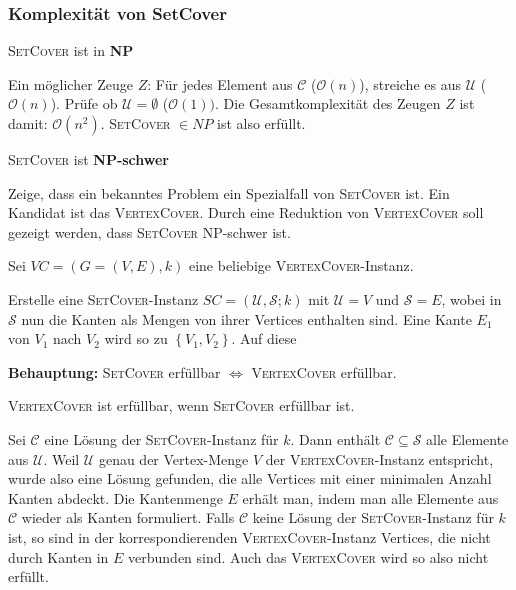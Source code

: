 \documentclass{article}
\begin{document}
\subsubsection*{Komplexität von SetCover}
\textsc{SetCover} ist in \textbf{NP}

Ein möglicher Zeuge $Z$: Für jedes Element aus $\mathcal{C}$ ($\mathcal{O}(n)$), streiche es aus $\mathcal{U}$ ($\mathcal{O}(n)$). Prüfe ob $\mathcal{U} = \emptyset$ ($\mathcal{O}(1))$. Die Gesamtkomplexität des Zeugen $Z$ ist damit: $\mathcal{O}(n^2)$. \textsc{SetCover} $\in NP$ ist also erfüllt.

\bigskip

\textsc{SetCover} ist \textbf{NP-schwer}

Zeige, dass ein bekanntes Problem ein Spezialfall von \textsc{SetCover} ist.
Ein Kandidat ist das \textsc{VertexCover}. Durch eine Reduktion von \textsc{VertexCover} soll gezeigt werden, dass \textsc{SetCover} NP-schwer ist.

\smallskip

Sei $VC = (G = (V,E), k)$ eine beliebige \textsc{VertexCover}-Instanz.

Erstelle eine \textsc{SetCover}-Instanz $SC = (\mathcal{U, S};  k)$ mit $\mathcal{U} = V$ und $\mathcal{S} = E$, wobei in $\mathcal{S}$ nun die Kanten als Mengen von ihrer Vertices enthalten sind. Eine Kante $E_1$ von $V_1$ nach $V_2$ wird so zu $\left\{V_1, V_2\right\}$. Auf diese 

\smallskip

\textbf{Behauptung:} \textsc{SetCover} erfüllbar $\Leftrightarrow$ \textsc{VertexCover} erfüllbar.

\smallskip

\textsc{VertexCover} ist erfüllbar, wenn \textsc{SetCover} erfüllbar ist.

Sei $\mathcal{C}$ eine Lösung der \textsc{SetCover}-Instanz für $k$. Dann enthält $\mathcal{C} \subseteq \mathcal{S}$ alle Elemente aus $\mathcal{U}$. Weil $\mathcal{U}$ genau der Vertex-Menge $V$ der \textsc{VertexCover}-Instanz entspricht, wurde also eine Lösung gefunden, die alle Vertices mit einer minimalen Anzahl Kanten abdeckt. Die Kantenmenge $E$ erhält man, indem man alle Elemente aus $\mathcal{C}$ wieder als Kanten formuliert. 
Falls $\mathcal{C}$ keine Lösung der \textsc{SetCover}-Instanz für $k$ ist, so sind in der korrespondierenden \textsc{VertexCover}-Instanz Vertices, die nicht durch Kanten in $E$ verbunden sind. Auch das \textsc{VertexCover} wird so also nicht erfüllt.
\end{document}
